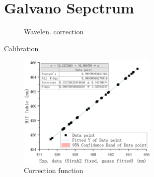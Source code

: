\documentclass[aspectratio=43,scheme=plain]{ctexbeamer}
\begin{document}
	\section{Galvano Sepctrum}	
	\begin{frame}{\insertsection}
		\begin{figure}[H]
			\centering
			\caption{Wavelen. correction}
		\end{figure}
	\end{frame}
	\begin{frame}{\insertsection}{Calibration}
		\begin{figure}[H]
			\centering
			\includegraphics[width=0.6\textwidth]{fitfunc.pdf}
			\caption{Correction function}
		\end{figure}
	\end{frame}
\end{document}

